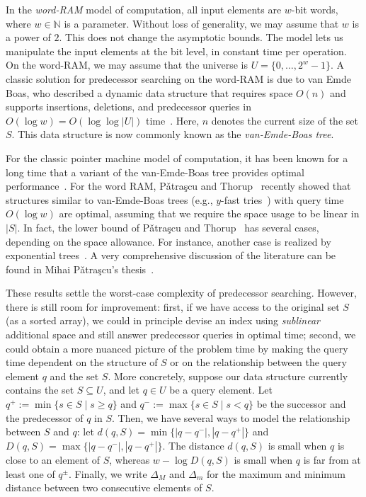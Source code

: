 \documentclass[a4paper,11pt]{article}
\newcommand{\N}{\mathbb{N}}
\newcommand{\?}{\mskip1.5mu}
\newcommand{\Patrascu}{P\v{a}tra\c{s}cu\xspace}
\begin{document}
In the \emph{word-RAM} model of computation, all input elements are 
$w$-bit words, where $w \in \N$ is a parameter. Without loss of 
generality, we may assume that $w$ is a power of $2$. This does not 
change the asymptotic bounds. The model lets us manipulate the input 
elements at the bit level, in constant time per operation. On the 
word-RAM, we may assume that the universe is 
$U = \{0, \dots, 2^{w}-1\}$. A classic solution for predecessor 
searching on the word-RAM is due to van Emde Boas, who described a 
dynamic data structure that requires space $O(n)$ and supports 
insertions, deletions, and predecessor queries in 
$O(\log w) = O(\log\log |U|)$ time~\cite{vEmdeBoas77,vEmdeBoasKaZi76,CormenLeRiSt09}.
Here, $n$ denotes the current size of the set $S$. This data 
structure is now commonly known as the 
\emph{van-Emde-Boas tree}.

For the classic pointer machine model of computation, it has been 
known for a long time that a variant of the van-Emde-Boas tree 
provides optimal performance~\cite{MehlhornNaAl88,Mulzer09}.
For the word RAM, \Patrascu and Thorup~\cite{PatrascuTh06,PatrascuTh07} 
recently showed that structures similar to van-Emde-Boas 
trees (e.g., $y$-fast tries~\cite{Willard83}) with query
time $O(\log w)$ are optimal, assuming that we require 
the space usage to be linear in $|S|$. In fact, the lower 
bound of \Patrascu and Thorup~\cite{PatrascuTh06,PatrascuTh07} 
has several cases, depending on the space allowance. 
For instance, another case is realized by exponential 
trees~\cite{AnderssonTh07}. A very comprehensive discussion 
of the literature can be found in Mihai \Patrascu's
thesis~\cite{Patrascu08}.

These results settle the worst-case complexity 
of predecessor searching. However, there is 
still room for improvement: first, if 
we have access to the original set $S$ (as a sorted array), 
we could in principle devise an index using 
\emph{sublinear} additional space and still answer 
predecessor queries in optimal time; second, we could
obtain a more nuanced picture of the problem time by 
making the query time dependent on the structure of $S$ 
or on the relationship between the query element $q$ 
and the set $S$. More concretely, suppose our data structure 
currently contains the set $S \subseteq U$, and let $q \in U$ 
be a query element.  Let $q^+ := \min\{s \in S \mid s \geq q \}$ and
$q^- := \max\{s \in S \mid s < q \}$ be the 
successor and the predecessor of $q$ in $S$.
Then, we have several ways to model the
relationship between $S$ and $q$: 
let $d(q, S) = \min\{|q - q^-|, |q - q^+|\}$ and 
$D(q, S) = \max\{|q - q^-|, |q - q^+|\}$.
The distance $d(q, S)$ is small when $q$ is close to an 
element of $S$, whereas $w - \log D(q, S)$
is small when $q$ is far from at least one of $q^\pm$.
Finally, we write $\Delta_M$ and $\Delta_m$ for the maximum 
and minimum distance between two consecutive elements of $S$.
\end{document}
